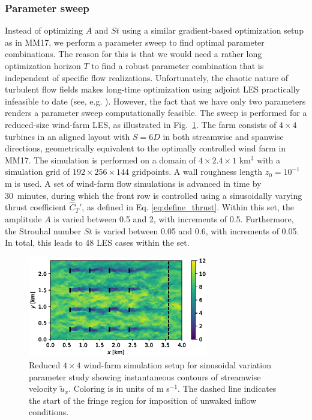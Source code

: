 \documentclass[wes, manuscript]{copernicus}
\newcommand{\cthat}{\widehat{C}_T'}
\begin{document}
\subsubsection{Parameter sweep}
Instead of optimizing $A$ and $St$ using a similar gradient-based optimization setup as in MM17, we perform a parameter sweep to find optimal parameter combinations. The reason for this is that we would need a rather long optimization horizon $T$ to find a robust parameter combination that is independent of specific flow realizations. Unfortunately, the chaotic nature of turbulent flow fields makes long-time optimization using adjoint LES practically infeasible to date (see, e.g. \citealp{wang2014least}). However, the fact that we have only two parameters renders a parameter sweep computationally feasible. The sweep is performed for a reduced-size wind-farm LES, as illustrated in Fig.~\ref{fig:sinus_setup}. The farm consists of $4 \times 4$ turbines in an aligned layout with $S = 6D$ in both streamwise and spanwise directions, geometrically equivalent to the optimally controlled wind farm in MM17. The simulation is performed on a domain of $4 \times 2.4 \times 1$ km$^3$ with a simulation grid of $192 \times 256 \times 144$ gridpoints. A wall roughness length $z_0 = 10^{-1}$ m is used. A set of wind-farm flow simulations is advanced in time by 30~minutes, during which the front row is controlled using a sinusoidally varying thrust coefficient $\cthat$, as defined in Eq. \eqref{eq:define_thrust}. Within this set, the amplitude $A$ is varied between 0.5 and 2, with increments of 0.5. Furthermore, the Strouhal number $St$ is varied between 0.05 and 0.6, with increments of 0.05. In total, this leads to 48 LES cases within the set. 

\begin{figure}
	\centering
	\includegraphics[width=0.7\textwidth]{setup_sinusoidal.eps}
	\caption{Reduced $4 \times 4$ wind-farm simulation setup for sinusoidal variation parameter study showing instantaneous contours of streamwise velocity $\widetilde{u}_x$. Coloring is in units of m s$^{-1}$. The dashed line indicates the start of the fringe region for imposition of unwaked inflow conditions. \label{fig:sinus_setup}}
\end{figure}
\end{document}
